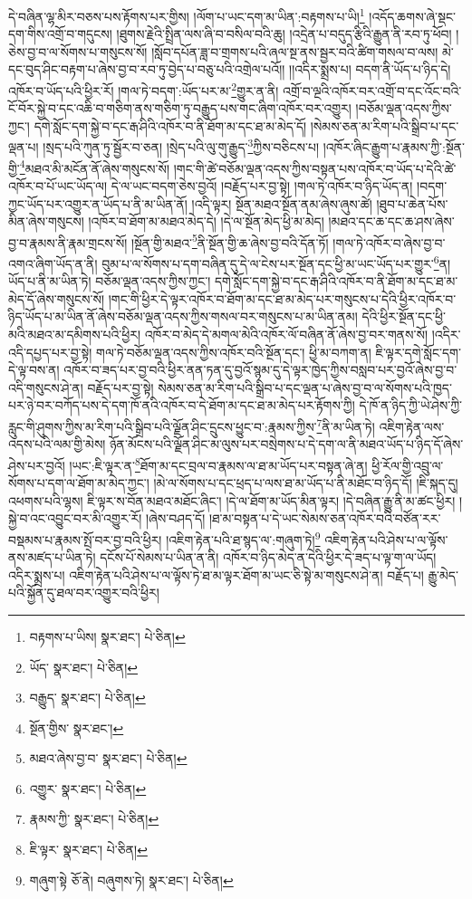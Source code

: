 དེ་བཞིན་ལྷ་མིར་བཅས་པས་རྟོགས་པར་གྱིས། །ལོག་པ་ཡང་དག་མ་ཡིན་:བརྟགས་པ་ཡི།\footnote{བརྟགས་པ་ཡིས།  སྣར་ཐང་།  པེ་ཅིན། } །འདོད་ཆགས་ཞེ་སྡང་དག་གིས་འགྲོ་བ་གདུངས། །ཐུགས་རྗེའི་སྤྲིན་ལས་ཞི་བ་བསིལ་བའི་ཆུ། །འདྲེན་པ་བདུད་རྩིའི་རྒྱུན་ནི་རབ་ཏུ་ཕོབ། །ཅེས་བྱ་བ་ལ་སོགས་པ་གསུངས་སོ། །སློབ་དཔོན་ཟླ་བ་གྲགས་པའི་ཞལ་སྔ་ནས་སྦྱར་བའི་ཚིག་གསལ་བ་ལས། མེ་དང་བུད་ཤིང་བརྟག་པ་ཞེས་བྱ་བ་རབ་ཏུ་བྱེད་པ་བཅུ་པའི་འགྲེལ་པའོ།། །།འདིར་སྨྲས་པ། བདག་ནི་ཡོད་པ་ཉིད་དེ། འཁོར་བ་ཡོད་པའི་ཕྱིར་རོ། །གལ་ཏེ་བདག་:ཡོད་པར་མ་\footnote{ཡོད་  སྣར་ཐང་།  པེ་ཅིན། }གྱུར་ན་ནི། འགྲོ་བ་ལྔའི་འཁོར་བར་འགྲོ་བ་དང་འོང་བའི་ངོ་བོར་སྐྱེ་བ་དང་འཆི་བ་གཅིག་ནས་གཅིག་ཏུ་བརྒྱུད་པས་གང་ཞིག་འཁོར་བར་འགྱུར། །བཅོམ་ལྡན་འདས་ཀྱིས་ཀྱང་། དགེ་སློང་དག་སྐྱེ་བ་དང་རྒ་ཤིའི་འཁོར་བ་ནི་ཐོག་མ་དང་ཐ་མ་མེད་དོ། །སེམས་ཅན་མ་རིག་པའི་སྒྲིབ་པ་དང་ལྡན་པ། །སྲད་པའི་ཀུན་ཏུ་སྦྱོར་བ་ཅན། །སྲེད་པའི་ལུ་གུ་རྒྱུད་\footnote{བརྒྱུད་  སྣར་ཐང་།  པེ་ཅིན། }ཀྱིས་བཅིངས་པ། །འཁོར་ཞིང་རྒྱུག་པ་རྣམས་ཀྱི་:སྔོན་གྱི་\footnote{སྔོན་གྱིས་  སྣར་ཐང་། }མཐའ་མི་མངོན་ནོ་ཞེས་གསུངས་སོ། །གང་གི་ཚེ་བཅོམ་ལྡན་འདས་ཀྱིས་བསྟན་པས་འཁོར་བ་ཡོད་པ་དེའི་ཚེ་འཁོར་བ་པོ་ཡང་ཡོད་ལ། དེ་ལ་ཡང་བདག་ཅེས་བྱའོ། །བརྗོད་པར་བྱ་སྟེ། །གལ་ཏེ་འཁོར་བ་ཉིད་ཡོད་ན། །བདག་ཀྱང་ཡོད་པར་འགྱུར་ན་ཡོད་པ་ནི་མ་ཡིན་ནོ། །འདི་ལྟར། སྔོན་མཐའ་སྔོན་ནམ་ཞེས་ཞུས་ཚེ། །ཐུབ་པ་ཆེན་པོས་མིན་ཞེས་གསུངས། །འཁོར་བ་ཐོག་མ་མཐའ་མེད་དེ། །དེ་ལ་སྔོན་མེད་ཕྱི་མ་མེད། །མཐའ་དང་ཆ་དང་ཆ་ཤས་ཞེས་བྱ་བ་རྣམས་ནི་རྣམ་གྲངས་སོ། །སྔོན་གྱི་མཐའ་\footnote{མཐའ་ཞེས་བྱ་བ་  སྣར་ཐང་།  པེ་ཅིན། }ནི་སྔོན་གྱི་ཆ་ཞེས་བྱ་བའི་དོན་ཏོ། །གལ་ཏེ་འཁོར་བ་ཞེས་བྱ་བ་འགའ་ཞིག་ཡོད་ན་ནི། བུམ་པ་ལ་སོགས་པ་དག་བཞིན་དུ་དེ་ལ་ངེས་པར་སྔོན་དང་ཕྱི་མ་ཡང་ཡོད་པར་གྱུར་\footnote{འགྱུར་  སྣར་ཐང་།  པེ་ཅིན། }ན། ཡོད་པ་ནི་མ་ཡིན་ཏེ། བཅོམ་ལྡན་འདས་ཀྱིས་ཀྱང་། དགེ་སློང་དག་སྐྱེ་བ་དང་རྒ་ཤིའི་འཁོར་བ་ནི་ཐོག་མ་དང་ཐ་མ་མེད་དོ་ཞེས་གསུངས་སོ། །གང་གི་ཕྱིར་དེ་ལྟར་འཁོར་བ་ཐོག་མ་དང་ཐ་མ་མེད་པར་གསུངས་པ་དེའི་ཕྱིར་འཁོར་བ་ཉིད་ཡོད་པ་མ་ཡིན་ནོ་ཞེས་བཅོམ་ལྡན་འདས་ཀྱིས་གསལ་བར་གསུངས་པ་མ་ཡིན་ནམ། དེའི་ཕྱིར་སྔོན་དང་ཕྱི་མའི་མཐའ་མ་དམིགས་པའི་ཕྱིར། འཁོར་བ་མེད་དེ་མགལ་མེའི་འཁོར་ལོ་བཞིན་ནོ་ཞེས་བྱ་བར་གནས་སོ། །འདིར་འདི་དཔྱད་པར་བྱ་སྟེ། གལ་ཏེ་བཅོམ་ལྡན་འདས་ཀྱིས་འཁོར་བའི་སྔོན་དང་། ཕྱི་མ་བཀག་ན། ཇི་ལྟར་དགེ་སློང་དག་དེ་ལྟ་བས་ན། འཁོར་བ་ཟད་པར་བྱ་བའི་ཕྱིར་ནན་ཏན་དུ་བྱའོ་སྙམ་དུ་དེ་ལྟར་ཁྱེད་ཀྱིས་བསླབ་པར་བྱའོ་ཞེས་བྱ་བ་འདི་གསུངས་ཤེ་ན། བརྗོད་པར་བྱ་སྟེ། སེམས་ཅན་མ་རིག་པའི་སྒྲིབ་པ་དང་ལྡན་པ་ཞེས་བྱ་བ་ལ་སོགས་པའི་ཁྱད་པར་ཉེ་བར་བཀོད་པས་དེ་དག་ཁོ་ནའི་འཁོར་བ་དེ་ཐོག་མ་དང་ཐ་མ་མེད་པར་རྟོགས་ཀྱི། དེ་ཁོ་ན་ཉིད་ཀྱི་ཡེ་ཤེས་ཀྱི་རླུང་གི་ཤུགས་ཀྱིས་མ་རིག་པའི་སྒྲིབ་པའི་ལྗོན་ཤིང་དྲུངས་ཕྱུང་བ་:རྣམས་ཀྱིས་\footnote{རྣམས་ཀྱི་  སྣར་ཐང་།  པེ་ཅིན། }ནི་མ་ཡིན་ཏེ། འཇིག་རྟེན་ལས་འདས་པའི་ལམ་གྱི་མེས། ཉོན་མོངས་པའི་ལྗོན་ཤིང་མ་ལུས་པར་བསྲེགས་པ་དེ་དག་ལ་ནི་མཐའ་ཡོད་པ་ཉིད་དོ་ཞེས་ཤེས་པར་བྱའོ། །ཡང་:ཇི་ལྟར་ན་\footnote{ཇི་ལྟར་  སྣར་ཐང་།  པེ་ཅིན། }ཐོག་མ་དང་བྲལ་བ་རྣམས་ལ་ཐ་མ་ཡོད་པར་བསྟན་ཞེ་ན། ཕྱི་རོལ་གྱི་འབྲུ་ལ་སོགས་པ་དག་ལ་ཐོག་མ་མེད་ཀྱང་། །མེ་ལ་སོགས་པ་དང་ཕྲད་པ་ལས་ཐ་མ་ཡོད་པ་ནི་མཐོང་བ་ཉིད་དོ། །ཇི་སྐད་དུ། འཕགས་པའི་ལྷས། ཇི་ལྟར་ས་བོན་མཐའ་མཐོང་ཞིང་། །དེ་ལ་ཐོག་མ་ཡོད་མིན་ལྟར། །དེ་བཞིན་རྒྱུ་ནི་མ་ཚང་ཕྱིར། །སྐྱེ་བ་འང་འབྱུང་བར་མི་འགྱུར་རོ། །ཞེས་བཤད་དོ། །ཐ་མ་བསྟན་པ་དེ་ཡང་སེམས་ཅན་འཁོར་བའི་བཙོན་རར་བསྡམས་པ་རྣམས་སྤོ་བར་བྱ་བའི་ཕྱིར། །འཇིག་རྟེན་པའི་ཐ་སྙད་ལ་:གཞུག་ཏེ།\footnote{གཞུག་སྟེ  ཅོ་ནེ། བཞུགས་ཏེ།  སྣར་ཐང་།  པེ་ཅིན། } འཇིག་རྟེན་པའི་ཤེས་པ་ལ་ལྟོས་ནས་མཛད་པ་ཡིན་ཏེ། དངོས་པོ་སེམས་པ་ཡིན་ན་ནི། འཁོར་བ་ཉིད་མེད་ན་དེའི་ཕྱིར་དེ་ཟད་པ་ལྟ་ག་ལ་ཡོད། འདིར་སྨྲས་པ། འཇིག་རྟེན་པའི་ཤེས་པ་ལ་ལྟོས་ཏེ་ཐ་མ་ལྟར་ཐོག་མ་ཡང་ཅི་སྟེ་མ་གསུངས་ཤེ་ན། བརྗོད་པ། རྒྱུ་མེད་པའི་སྐྱོན་དུ་ཐལ་བར་འགྱུར་བའི་ཕྱིར། 